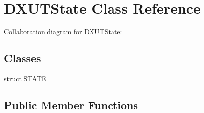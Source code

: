 \hypertarget{class_d_x_u_t_state}{
\section{DXUTState Class Reference}
\label{class_d_x_u_t_state}
}
Collaboration diagram for DXUTState:\subsection*{Classes}
\begin{DoxyCompactItemize}
\item 
struct \hyperlink{struct_d_x_u_t_state_1_1_s_t_a_t_e}{STATE}
\end{DoxyCompactItemize}
\subsection*{Public Member Functions}
